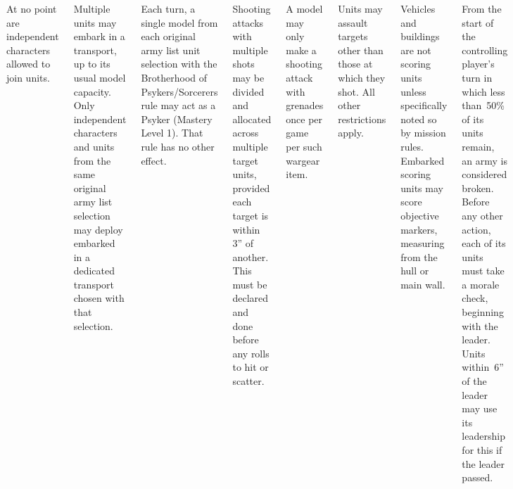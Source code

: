 \begin{columns}
%

\vspace{-9pt}%
  At no point are independent characters
allowed to join units.

  Multiple units may embark
in a transport, up to its usual model capacity. Only independent
characters and units from the same original army list selection may
deploy embarked in a dedicated transport chosen with that selection.

%

\vspace{-9pt}%
  Each turn, a single
model from each original army list unit selection with the Brotherhood
of Psykers/Sorcerers rule may act as a Psyker (Mastery Level 1).  That
rule has no other effect.

\columnbreak
{}%

\vspace{-9pt}%
  Shooting attacks with multiple shots may
be divided and allocated across multiple target units, provided each
target is within 3'' of another. This must be declared and done before
any rolls to hit or scatter.

 A model may only make a shooting attack
with grenades once per game per such wargear item.



  Units may assault targets other than
those at which they shot.  All other restrictions apply.


%

\vspace{-9pt}%
 Vehicles and buildings are
not scoring units unless specifically noted so by mission rules.
Embarked scoring units may score objective markers, measuring from the
hull or main wall.

  From the start of the controlling
player's turn in which less than~50\% of its units remain, an army is
considered broken.  Before any other action, each of its units must
take a morale check, beginning with the leader.  Units within~6'' of
the leader may use its leadership for this if the leader passed.


\end{columns}
